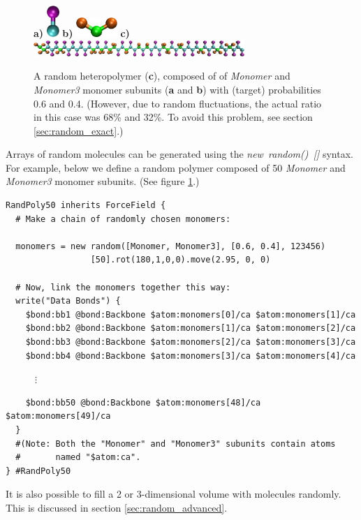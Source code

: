 \documentclass[11pt]{article}
\begin{document}
\begin{figure}[htbp]
\centering
\textbf{a)}
\includegraphics[height=1.2cm]{random_2bead.jpg}
\hspace{0.2cm}
\textbf{b)}
\includegraphics[height=0.75cm]{random_3bead.jpg}
\hspace{0.2cm}
\textbf{c)}
\includegraphics[width=8cm]{random_heteropolymer.jpg}
\caption{
\label{fig:random_heteropolymer}
A random heteropolymer (\textbf{c}),
composed of of \textit{Monomer} and \textit{Monomer3} monomer subunits
(\textbf{a} and \textbf{b}) with (target) probabilities 0.6 and 0.4.
(However, due to random fluctuations, the actual ratio 
 in this case was 68\% and 32\%.
 To avoid this problem, see section \ref{sec:random_exact}.)
}
\end{figure}
Arrays of random molecules can be generated using the 
\mbox{\textit{new random() []}} syntax.  For example,
below we define a random polymer composed of 50 
\textit{Monomer} and \textit{Monomer3} monomer subunits.
(See figure \ref{fig:random_heteropolymer}.)
\begin{verbatim}
RandPoly50 inherits ForceField {
  # Make a chain of randomly chosen monomers:

  monomers = new random([Monomer, Monomer3], [0.6, 0.4], 123456)
                 [50].rot(180,1,0,0).move(2.95, 0, 0)

  # Now, link the monomers together this way:
  write("Data Bonds") {
    $bond:bb1 @bond:Backbone $atom:monomers[0]/ca $atom:monomers[1]/ca
    $bond:bb2 @bond:Backbone $atom:monomers[1]/ca $atom:monomers[2]/ca
    $bond:bb3 @bond:Backbone $atom:monomers[2]/ca $atom:monomers[3]/ca
    $bond:bb4 @bond:Backbone $atom:monomers[3]/ca $atom:monomers[4]/ca
\end{verbatim}
$\quad \quad \quad \vdots $
\begin{verbatim}
    $bond:bb50 @bond:Backbone $atom:monomers[48]/ca $atom:monomers[49]/ca
  }
  #(Note: Both the "Monomer" and "Monomer3" subunits contain atoms
  #       named "$atom:ca".
} #RandPoly50
\end{verbatim}
It is also possible to fill a 2 or 3-dimensional volume with
molecules randomly.  This is discussed in section
\ref{sec:random_advanced}.
\end{document}
